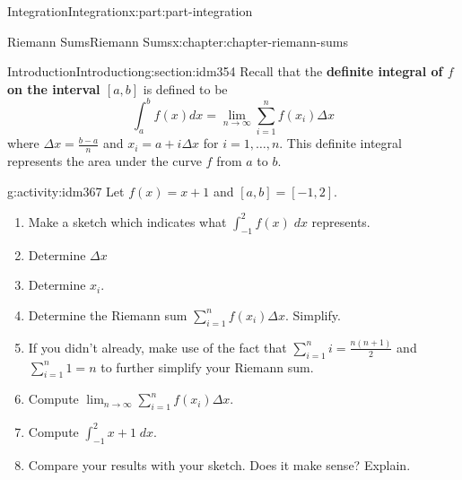 \documentclass[oneside,10pt,]{book}
\newcommand{\terminology}[1]{\textbf{#1}}
\numberwithin{equation}{section}
\begin{document}
\begin{partptx}{Integration}{}{Integration}{}{}{x:part:part-integration}
%
\typeout{************************************************}
\typeout{************************************************}
%
\begin{chapterptx}{Riemann Sums}{}{Riemann Sums}{}{}{x:chapter:chapter-riemann-sums}
%
%
\typeout{************************************************}
\typeout{************************************************}
%
\begin{sectionptx}{Introduction}{}{Introduction}{}{}{g:section:idm354}
Recall that the \terminology{definite integral of \(f\) on the interval \([a,b]\)} is defined to be%
\begin{equation*}
\int_a^b f(x) dx = \lim_{n \to \infty} \sum_{i=1}^n f(x_i)\Delta x
\end{equation*}
where \(\displaystyle \Delta x = \frac{b-a}{n}\) and \(x_i = a + i \Delta x\) for \(i = 1, \dots, n\). This definite integral represents the area under the curve \(f\) from \(a\) to \(b\).%
\begin{activity}{}{g:activity:idm367}%
Let \(f(x) = x+1\) and \([a,b] = [-1,2]\).%
\begin{enumerate}[font=\bfseries,label=(\alph*),ref=\alph*]
\item{}Make a sketch which indicates what \(\displaystyle\int_{-1}^2 f(x) \; dx\) represents.\item{}Determine \(\Delta x\)%
\item{}Determine \(x_i\).%
\item{}Determine the Riemann sum \(\displaystyle\sum_{i=1}^n f(x_i) \Delta x\). Simplify.%
\item{}If you didn't already, make use of the fact that \(\displaystyle \sum_{i=1}^n i = \frac{n(n+1)}{2}\) and \(\displaystyle \sum_{i=1}^n 1 = n\) to further simplify your Riemann sum.%
\item{}Compute \(\displaystyle\lim_{n \to \infty} \sum_{i=1}^n f(x_i) \Delta x\).%
\item{}Compute \(\displaystyle\int_{-1}^2 x+1 \; dx\).%
\item{}Compare your results with your sketch. Does it make sense? Explain.%
\end{enumerate}
\end{activity}
\end{sectionptx}
%
%
\typeout{************************************************}
\typeout{************************************************}

\end{chapterptx}
\end{partptx}
\end{document}
